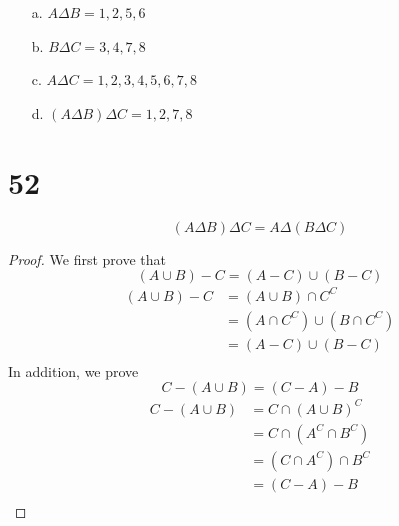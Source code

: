 \documentclass{article}
\begin{document}
\begin{enumerate}
    \item[a.] $A \Delta B = {1,2,5,6}$ 
    \item[b.] $B \Delta C = {3,4,7,8}$
    \item[c.] $A \Delta C = {1,2,3,4,5,6,7,8}$
    \item[d.] $(A \Delta B) \Delta C = {1,2,7,8}$
\end{enumerate}

\section{52}
\[
(A \Delta B )\Delta C = A \Delta (B \Delta C)
\]
\begin{proof}
We first prove that 
\[
(A \cup B) -C = (A-C) \cup (B-C) \tag{1}
\]
    \begin{align*}
        (A \cup B) -C &= (A \cup B) \cap C^C \tag{By Set Difference Law}\\
        &= (A \cap C^C) \cup (B \cap C^C) \tag{By Distributive Law}\\
        &= (A - C) \cup (B - C) \tag{By Set Difference Law}\\
    \end{align*}
In addition, we prove
\[
C - (A \cup B) =(C - A) - B \tag{3}
\]
\begin{align*}
        C - (A \cup B) &= C \cap (A \cup B)^C \tag{By Set Difference Law}\\
        &= C \cap (A^C \cap B^C) \tag{By DeMorgan's Law}\\
        &= (C \cap A^C) \cap B^C \tag{By Associative Law}\\
        &= (C - A) - B \tag{By Set Difference Law}\\
\end{align*}

\end{proof}
\end{document}
